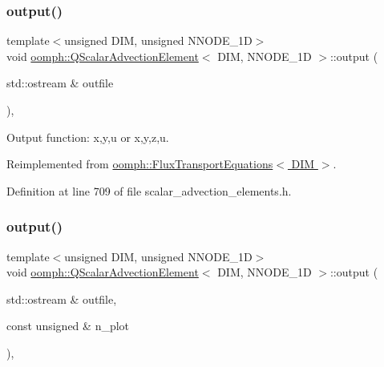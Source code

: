 \subsubsection{\texorpdfstring{output()}{output()}\hspace{0.1cm}{\footnotesize\ttfamily [1/2]}}
{\footnotesize\ttfamily template$<$unsigned D\+IM, unsigned N\+N\+O\+D\+E\+\_\+1D$>$ \\
void \hyperlink{classoomph_1_1QScalarAdvectionElement}{oomph\+::\+Q\+Scalar\+Advection\+Element}$<$ D\+IM, N\+N\+O\+D\+E\+\_\+1D $>$\+::output (\begin{DoxyParamCaption}\item[{std\+::ostream \&}]{outfile }\end{DoxyParamCaption})\hspace{0.3cm}{\ttfamily [inline]}, {\ttfamily [virtual]}}



Output function\+: x,y,u or x,y,z,u. 



Reimplemented from \hyperlink{classoomph_1_1FluxTransportEquations_afd690f82a24bc20b686fc7d25a59f775}{oomph\+::\+Flux\+Transport\+Equations$<$ D\+I\+M $>$}.



Definition at line 709 of file scalar\+\_\+advection\+\_\+elements.\+h.

\mbox{\label{classoomph_1_1QScalarAdvectionElement_a1e964b1183bd25bcd9a55c7e6997a4c1}} 
\subsubsection{\texorpdfstring{output()}{output()}\hspace{0.1cm}{\footnotesize\ttfamily [2/2]}}
{\footnotesize\ttfamily template$<$unsigned D\+IM, unsigned N\+N\+O\+D\+E\+\_\+1D$>$ \\
void \hyperlink{classoomph_1_1QScalarAdvectionElement}{oomph\+::\+Q\+Scalar\+Advection\+Element}$<$ D\+IM, N\+N\+O\+D\+E\+\_\+1D $>$\+::output (\begin{DoxyParamCaption}\item[{std\+::ostream \&}]{outfile,  }\item[{const unsigned \&}]{n\+\_\+plot }\end{DoxyParamCaption})\hspace{0.3cm}{\ttfamily [inline]}, {\ttfamily [virtual]}}



